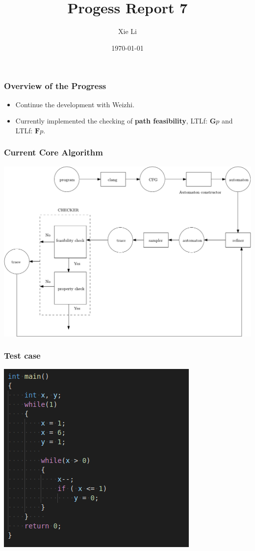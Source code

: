 \documentclass[11pt]{beamer}
\title{Progess Report 7}
\date{\today}
\author{Xie Li}
\begin{document}
\maketitle

\begin{frame}\frametitle{Overview of the Progress}
\begin{itemize}
\item Continue the development with Weizhi.
\item Currently implemented the checking of \textbf{path feasibility}, LTLf: $\mathbf{G}p$ and LTLf: $\textbf{F}p$.
\end{itemize}

\end{frame}


\begin{frame}\frametitle{Current Core Algorithm}

\begin{center}
\includegraphics[scale=0.5]{flowgraph.pdf}
\end{center}

\end{frame}

\begin{frame}\frametitle{Test case}
\begin{center}
\includegraphics[scale=0.6]{pro.png}
\end{center}
\end{frame}
\end{document}
